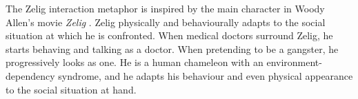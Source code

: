 \documentclass[
		twoside,openright,titlepage,numbers=noenddot,manychapters,
		headinclude,%
                footinclude=false,cleardoublepage=empty,
                BCOR=5mm,
		fontsize=11pt, %
                 enabledeprecatedfontcommands]{scrreprt}
\begin{document}






The Zelig interaction metaphor is inspired by the main character in Woody Allen’s movie \emph{Zelig} \cite[]{allen2001z}. Zelig physically and behaviourally adapts to the social situation at which he is confronted. When medical doctors surround Zelig, he starts behaving and talking as a doctor. When pretending to be a gangster, he progressively looks as one. He is a human chameleon with an environment-dependency syndrome, and he adapts his behaviour and even physical appearance to the social situation at hand. %

\end{document}
